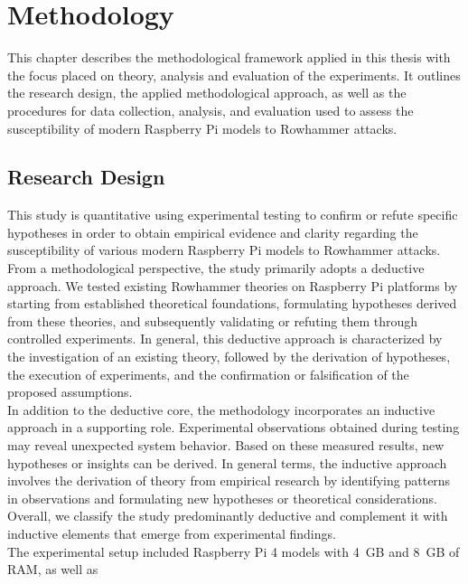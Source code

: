\section{Methodology} \label{sec:methodology}
  This chapter describes the methodological framework applied in this thesis 
  with the focus placed on theory, analysis and evaluation of the experiments. 
  It outlines the research design, the applied methodological approach, as 
  well as the procedures for data collection, analysis, and evaluation used 
  to assess the susceptibility of modern Raspberry Pi models to Rowhammer 
  attacks.

  \subsection{Research Design} \label{subsec:research-design}
    This study is quantitative using experimental testing to confirm or refute 
    specific hypotheses in order to obtain empirical evidence and clarity 
    regarding the susceptibility of various modern Raspberry Pi models to 
    Rowhammer attacks.
    \\
    From a methodological perspective, the study primarily adopts a deductive approach. We tested existing 
    Rowhammer theories on Raspberry Pi platforms by starting from established theoretical 
    foundations, formulating hypotheses derived from these theories, and subsequently validating or 
    refuting them through controlled experiments. In general, this deductive approach is characterized by 
    the investigation of an existing theory, followed by the derivation of hypotheses, the execution of 
    experiments, and the confirmation or falsification of the proposed assumptions. \\
    In addition to the deductive core, the methodology incorporates an inductive approach in a supporting 
    role. Experimental observations obtained during testing may reveal unexpected system behavior. Based 
    on these measured results, new hypotheses or insights can be derived. In general terms, the inductive 
    approach involves the derivation of theory from empirical research by identifying patterns in 
    observations and formulating new hypotheses or theoretical considerations. Overall, we classify the study 
    predominantly deductive and complement it with inductive elements that emerge from experimental 
    findings. 
    \\
    The experimental setup included Raspberry Pi 4 models with 4~GB and 8~GB of RAM, as well as 
